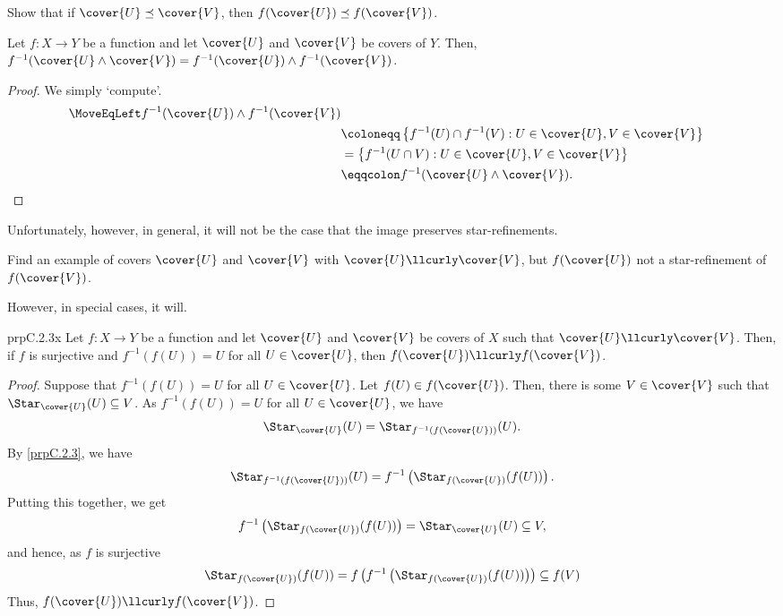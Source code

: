 \begin{exr}{}{}
Show that if $\cover{U}\preceq \cover{V}$, then $f(\cover{U})\preceq f(\cover{V})$.
\end{exr}
\begin{prp}{}{}
Let $f\colon X\rightarrow Y$ be a function and let $\cover{U}$ and $\cover{V}$ be covers of $Y$.  Then, $f^{-1}(\cover{U}\wedge \cover{V})=f^{-1}(\cover{U})\wedge f^{-1}(\cover{V})$.
\begin{proof}
We simply `compute'.
\begin{equation}
\begin{split}
\MoveEqLeft
f^{-1}(\cover{U})\wedge f^{-1}(\cover{V}) \\
& \coloneqq \left\{ f^{-1}(U)\cap f^{-1}(V):U\in \cover{U},V\in \cover{V}\right\} \\
& =\left\{ f^{-1}(U\cap V):U\in \cover{U},V\in \cover{V}\right\} \\
& \eqqcolon f^{-1}(\cover{U}\wedge \cover{V}).
\end{split}
\end{equation}
\end{proof}
\end{prp}
Unfortunately, however, in general, it will not be the case that the image preserves star-refinements.
\begin{exr}{}{}
Find an example of covers $\cover{U}$ and $\cover{V}$ with $\cover{U}\llcurly \cover{V}$, but $f(\cover{U})$ not a star-refinement of $f(\cover{V})$.
\end{exr}
However, in special cases, it will.
\begin{prp}{}{prpC.2.3x}
Let $f\colon X\rightarrow Y$ be a function and let $\cover{U}$ and $\cover{V}$ be covers of $X$ such that $\cover{U}\llcurly \cover{V}$.  Then, if $f$ is surjective and $f^{-1}(f(U))=U$ for all $U\in \cover{U}$, then $f(\cover{U})\llcurly f(\cover{V})$.
\begin{proof}
Suppose that $f^{-1}(f(U))=U$ for all $U\in \cover{U}$.  Let $f(U)\in f(\cover{U})$.  Then, there is some $V\in \cover{V}$ such that $\Star _{\cover{U}}(U)\subseteq V$.  As $f^{-1}(f(U))=U$ for all $U\in \cover{U}$, we have
\begin{equation}
\Star _{\cover{U}}(U)=\Star _{f^{-1}(f(\cover{U}))}(U).
\end{equation}
By \cref{prpC.2.3}, we have
\begin{equation}
\Star _{f^{-1}(f(\cover{U}))}(U)=f^{-1}\left( \Star _{f(\cover{U})}(f(U))\right) .
\end{equation}
Putting this together, we get
\begin{equation}
f^{-1}\left( \Star _{f(\cover{U})}(f(U))\right) =\Star _{\cover{U}}(U)\subseteq V,
\end{equation}
and hence, as $f$ is surjective
\begin{equation*}
\Star _{f(\cover{U})}(f(U))=f\left( f^{-1}\left( \Star _{f(\cover{U})}(f(U))\right) \right) \subseteq f(V)
\end{equation*}
Thus, $f(\cover{U})\llcurly f(\cover{V})$.
\end{proof}
\end{prp}

